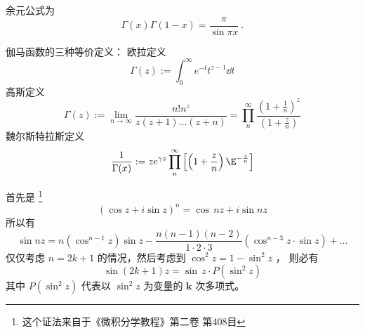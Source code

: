
\begin{issues}
\end{issues}


余元公式为
\begin{equation}
\Gamma(x)\Gamma(1-x)=\frac{\pi}{\sin  \pi x}~.
\end{equation}

\begin{lemma}{伽马函数的三种等价定义：}
欧拉定义
\begin{equation}
\Gamma(z):=\int^{\infty}_{0}e^{-t}t^{z-1} \dd{t}
\end{equation}
高斯定义
\begin{equation}
\Gamma(z):=\lim_{n \rightarrow \infty}{\frac{n!n^z}{z(z+1)\dots (z+n)}}=\prod_{n}^{\infty}\frac{\left( 1+\frac1n \right)^z}{\left( 1+\frac zn \right)}
\end{equation}
魏尔斯特拉斯定义
\begin{equation}
\frac1{\Gamma(x)}:=ze^{\gamma z}\prod_{n}^{\infty}\left[ \left( 1+\frac{z}{n}\right)\E^{-\frac{z}{n}}  \right]
\end{equation}
\end{lemma}
首先是 \footnote{这个证法来自于《微积分学教程》第二卷 第408目}
\begin{equation}
(\cos z+i\sin z)^n=\cos\,nz+i\sin nz
\end{equation}
所以有
\begin{equation}
\sin nz=n(\cos^{n-1}z)\sin z-\frac{n(n-1)(n-2)}{1\cdot 2\cdot 3}(\cos^{n-3}z \cdot \sin z)+\dots
\end{equation}
仅仅考虑 $n=2k+1$ 的情况，然后考虑到 $\cos^2 z=1-\sin^2z$ ， 则必有
\begin{equation}
\sin(2k+1)z=\sin\,z\cdot P(\sin^2z)
\end{equation}
其中 $P(\sin^2z)$ 代表以 $ \sin^2z$ 为变量的 $\mathbf{k}$ 次多项式。

